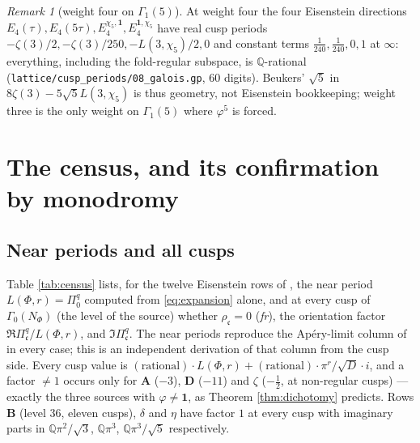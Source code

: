 \documentclass[11pt]{amsart}
\theoremstyle{definition}
\theoremstyle{remark}
\newtheorem{remark}[theorem]{Remark}
\newcommand{\Q}{\mathbb Q}\newcommand{\Z}{\mathbb Z}\newcommand{\R}{\mathbb R}\newcommand{\C}{\mathbb C}\newcommand{\HH}{\mathbb H}
\newcommand{\cc}{\mathfrak c}\newcommand{\Pc}{\Pi_{\cc}}\newcommand{\Pq}{\Pi^{q}}
\begin{document}
\begin{remark}[weight four on $\Gamma_1(5)$]
At weight four the four Eisenstein directions $E_4(\tau),E_4(5\tau),E_4^{\chi_5,\mathbf 1},E_4^{\mathbf 1,\chi_5}$ have real cusp periods $-\zeta(3)/2,-\zeta(3)/250,-L(3,\chi_5)/2,0$ and constant terms $\frac1{240},\frac1{240},0,1$ at $\infty$: everything, including the fold-regular subspace, is $\Q$-rational (\texttt{lattice/cusp\_periods/08\_galois.gp}, $60$ digits). Beukers' $\sqrt5$ in $8\zeta(3)-5\sqrt5L(3,\chi_5)$ \cite{Beukers1987} is thus geometry, not Eisenstein bookkeeping; weight three is the only weight on $\Gamma_1(5)$ where $\varphi^5$ is forced.
\end{remark}

\section{The census, and its confirmation by monodromy}\label{sec:census}

\subsection{Near periods and all cusps}
Table \ref{tab:census} lists, for the twelve Eisenstein rows of \cite[Table 1]{Companions}, the near period $L(\Phi,r)=\Pq_0$ computed from \eqref{eq:expansion} alone, and at every cusp of $\Gamma_0(N_\Phi)$ (the level of the source) whether $\rho_{\cc}=0$ (\emph{fr}), the orientation factor $\Re\Pq_{\cc}/L(\Phi,r)$, and $\Im\Pq_{\cc}$. The near periods reproduce the Ap\'ery-limit column of \cite{ProjSources} in every case; this is an independent derivation of that column from the cusp side. Every cusp value is $(\text{rational})\cdot L(\Phi,r)+(\text{rational})\cdot\pi^r/\sqrt D\cdot i$, and a factor $\ne1$ occurs only for $\mathbf A$ ($-3$), $\mathbf D$ ($-11$) and $\zeta$ ($-\tfrac12$, at non-regular cusps) --- exactly the three sources with $\varphi\ne\mathbf 1$, as Theorem \ref{thm:dichotomy} predicts. Rows $\mathbf B$ (level $36$, eleven cusps), $\delta$ and $\eta$ have factor $1$ at every cusp with imaginary parts in $\Q\pi^2/\sqrt3$, $\Q\pi^3$, $\Q\pi^3/\sqrt5$ respectively.
\end{document}
